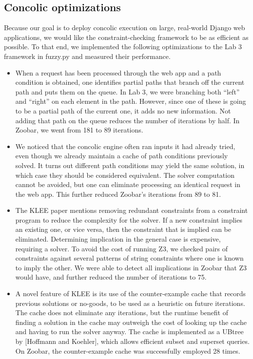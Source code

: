\documentclass{scrartcl}
\begin{document}
\subsection{Concolic optimizations}

Because our goal is to deploy concolic execution on large, real-world
Django web applications, we would like the constraint-checking framework
to be as efficient as possible. To that end, we implemented the
following optimizations to the Lab 3 framework in fuzzy.py and measured
their performance.

\begin{itemize}
\item When a request has been processed through the web app and a path
condition is obtained, one identifies partial paths that branch off the
current path and puts them on the queue. In Lab 3, we were branching
both ``left'' and ``right'' on each element in the path. However, since
one of these is going to be a partial path of the current one, it adds
no new information. Not adding that path on the queue reduces the number
of iterations by half. In Zoobar, we went from 181 to 89 iterations.

\item We noticed that the concolic engine often ran inputs it had
already tried, even though we already maintain a cache of path
conditions previously solved. It turns out different path conditions
may yield the same solution, in which case they should be considered
equivalent. The solver computation cannot be avoided, but one can
eliminate processing an identical request in the web app. This further
reduced Zoobar's iterations from 89 to 81.

\item The KLEE paper mentions removing redundant constraints from a
constraint program to reduce the complexity for the solver. If a new
constraint implies an existing one, or vice versa, then the constraint
that is implied can be eliminated.
Determining implication in the general case is expensive, requiring a
solver. To avoid the cost of running Z3, we checked pairs of constraints
against several patterns of string constraints where one is known to
imply the other. We were able to detect all implications in Zoobar that
Z3 would have, and further reduced the number of iterations to 75.

\item A novel feature of KLEE is its use of the counter-example cache
that records previous solutions or no-goods, to be used as a heuristic
on future iterations. The cache does not eliminate any iterations, but
the runtime benefit of finding a solution in the cache may outweigh the
cost of looking up the cache and having to run the solver anyway.
The cache is implemented as a UBtree by [Hoffmann and Koehler],
which allows efficient subset and superset queries. On Zoobar, the
counter-example cache was successfully employed 28 times.
\end{itemize}
\end{document}
